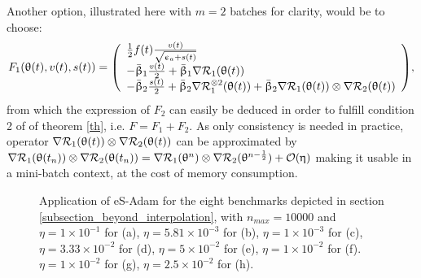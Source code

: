 \documentclass[article,authoryear,jmlmc]{beg_32}             %
\begin{document}
Another option, illustrated here with $m=2$ batches for clarity, would be to choose:
\begin{eqnarray}
\label{F_j_adam_2}
F_1(\theta(t),v(t),s(t))=\left(\begin{array}{l}
  \frac{1}{2}f(t) \frac{v(t)}{\sqrt{\epsilon_a+s(t)}}\\
     -\bar{\beta}_1 \frac{v(t)}{2}+\bar{\beta}_1\nR_1(\theta(t))\\
     -\bar{\beta}_2 \frac{s(t)}{2}+\bar{\beta}_2\nR_1^{\otimes 2}(\theta(t))+\bar{\beta}_2\nR_1(\theta(t))\otimes\nR_2(\theta(t)) \\
  \end{array}\right),
\end{eqnarray}
from which the expression of $F_2$ can easily be deduced in order to fulfill condition 2 of of theorem \ref{th}, i.e. $F=F_1+F_2$. 
As only consistency is needed in practice, operator 
$
\nabla \mathcal{R}_1(\uptheta(t))\otimes\nabla \mathcal{R}_2(\uptheta(t))
$
can be approximated by  
$
\nabla \mathcal{R}_1(\uptheta(t_n))\otimes\nabla \mathcal{R}_2(\uptheta(t_n)) = \nabla \mathcal{R}_1(\uptheta^n)\otimes\nabla \mathcal{R}_2(\uptheta^{n-\frac12}) + \mathcal{O}(\upeta)
$
making it usable in a mini-batch context, at the cost of memory consumption. 


\begin{figure}[h!]
	\centering
	\scalebox{0.60}{}
        \caption{
          Application of eS-Adam for the eight benchmarks depicted in section \ref{subsection_beyond_interpolation}, with $n_{max}=10000$ and
 $\eta = 1   \times 10^{-1}$  for \exOne    (a),
 $\eta = 5.81\times 10^{-3}$  for \exTwo    (b),
 $\eta = 1   \times 10^{-3}$  for \exThree  (c),
 $\eta = 3.33\times 10^{-2}$  for \exFour   (d),
 $\eta = 5   \times 10^{-2}$  for \exFive   (e),
 $\eta = 1   \times 10^{-2}$  for \exSix    (f).
 $\eta = 1   \times 10^{-2}$  for \exSeven  (g),
 $\eta = 2.5 \times 10^{-2}$  for \exHeight (h).
}
	\label{speth_adam_exs}
\end{figure}
\end{document}
